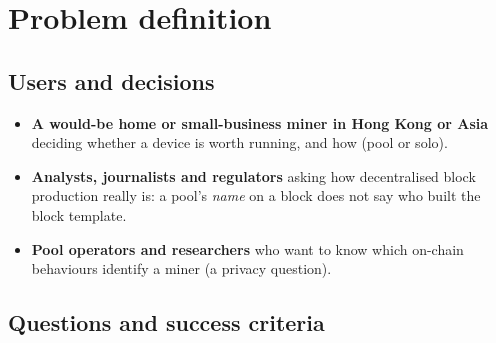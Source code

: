 \documentclass[
  11pt,
  a4paper,
]{article}
\providecommand{\tightlist}{%
  \setlength{\itemsep}{0pt}\setlength{\parskip}{0pt}}
\begin{document}

\section{Problem definition}\label{problem-definition}

\subsection{Users and decisions}\label{users-and-decisions}

\begin{itemize}
\tightlist
\item
  \textbf{A would-be home or small-business miner in Hong Kong or Asia}
  deciding whether a device is worth running, and how (pool or solo).
\item
  \textbf{Analysts, journalists and regulators} asking how decentralised
  block production really is: a pool's \emph{name} on a block does not
  say who built the block template.
\item
  \textbf{Pool operators and researchers} who want to know which
  on-chain behaviours identify a miner (a privacy question).
\end{itemize}


\subsection{Questions and success
criteria}\label{questions-and-success-criteria}
\end{document}
